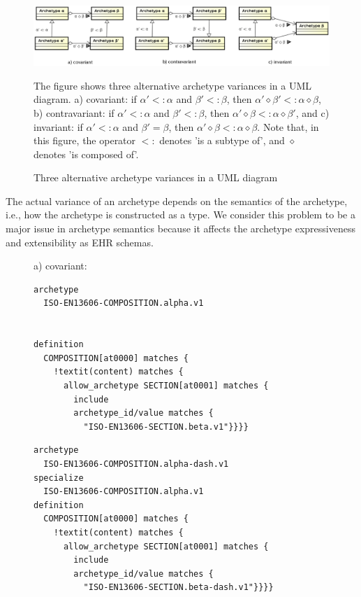 \documentclass[preprint,3p,onecolumn,times,review]{article}
\begin{document}
{\begin{figure}[!htbp]
  \begin{center}
    \includegraphics[width=16cm]{archetype_variance.eps}  
  \end{center}
  \caption{Three alternative archetype variances in a UML diagram}\label{fig:archetype_variances}
  {\footnotesize
    The figure shows three alternative archetype variances in a UML diagram. a) covariant: if $\alpha' <: \alpha$ and $\beta' <: \beta$, then $\alpha' \diamond \beta' <: \alpha \diamond \beta$, b) contravariant: if $\alpha' <: \alpha$ and $\beta' <: \beta$, then $\alpha' \diamond \beta <: \alpha \diamond \beta'$, and c) invariant: if $\alpha' <: \alpha$ and $\beta'= \beta$, then $\alpha' \diamond \beta <: \alpha \diamond \beta$.
    Note that, in this figure, the operator $<:$ denotes 'is a subtype of', and $\diamond$ denotes 'is composed of'.
    }
\end{figure}

The actual variance of an archetype depends on the semantics of the archetype, i.e., how the archetype is constructed as a type. We consider this problem to be a major issue in archetype semantics because it affects the archetype expressiveness and extensibility as EHR schemas.

\begin{figure}[!htbp]
a) covariant:

\begin{minipage}{0.49\linewidth}
\begin{Verbatim}[frame=single,fontsize=\small, commandchars=!\(\)]
archetype
  ISO-EN13606-COMPOSITION.alpha.v1


definition
  COMPOSITION[at0000] matches {
    !textit(content) matches {
      allow_archetype SECTION[at0001] matches {
        include
        archetype_id/value matches {
          "ISO-EN13606-SECTION.beta.v1"}}}}
\end{Verbatim}
\end{minipage}
\begin{minipage}{0.49\linewidth}
\begin{Verbatim}[frame=single,fontsize=\small, commandchars=!\(\)]
archetype
  ISO-EN13606-COMPOSITION.alpha-dash.v1
specialize
  ISO-EN13606-COMPOSITION.alpha.v1
definition
  COMPOSITION[at0000] matches {
    !textit(content) matches {
      allow_archetype SECTION[at0001] matches {
        include
        archetype_id/value matches {
          "ISO-EN13606-SECTION.beta-dash.v1"}}}}
\end{Verbatim}
\end{minipage}


\end{figure}}
\end{document}
